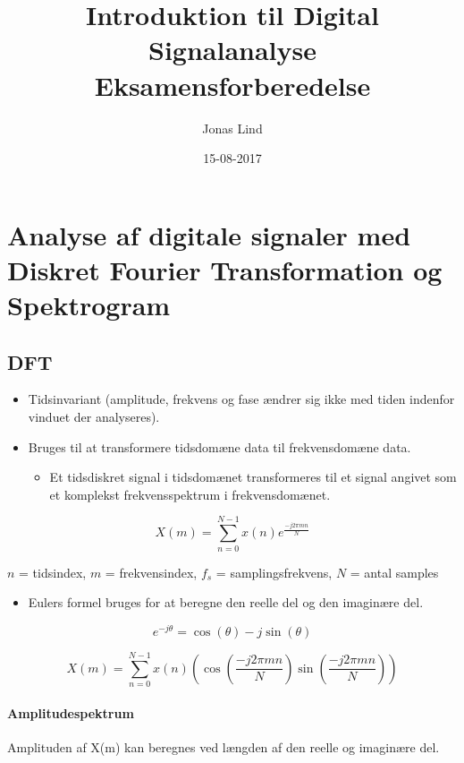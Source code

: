 \documentclass[danish]{article}
\begin{document}
\title{\textbf{Introduktion til Digital Signalanalyse }   Eksamensforberedelse}
\author{Jonas Lind}
\date{15-08-2017}
\maketitle
\section{Analyse af digitale signaler med Diskret Fourier Transformation og Spektrogram}
\subsection{DFT}
\begin{itemize}
	\item Tidsinvariant (amplitude, frekvens og fase ændrer sig ikke med tiden indenfor vinduet der analyseres).
	\item Bruges til at transformere tidsdomæne data til frekvensdomæne data.
	\begin{itemize}
		\item Et tidsdiskret signal i tidsdomænet transformeres til et signal angivet som et komplekst frekvensspektrum i frekvensdomænet.
	\end{itemize}
\end{itemize}

\begin{equation}
X(m)=\sum_{n=0}^{N-1}x(n)e^{\frac{-j2\pi mn}{N}}
\end{equation}

 \setlength\parindent{24pt} $n$ = tidsindex, $m$ = frekvensindex, $f_s$ = samplingsfrekvens, $N$ = antal samples

\begin{itemize}
	\item Eulers formel bruges for at beregne den reelle del og den imaginære del.
\end{itemize}

\begin{equation}
e^{-j\theta}=\cos(\theta) -j\sin(\theta)
\end{equation}

\begin{equation}
X(m)=\sum_{n=0}^{N-1}x(n)(\cos{\left(\frac{-j2\pi mn}{N}\right)}\sin{\left(\frac{-j2\pi mn}{N}\right)})
\end{equation}

\paragraph{Amplitudespektrum} Amplituden af X(m) kan beregnes ved længden af den reelle og imaginære del.
\end{document}
